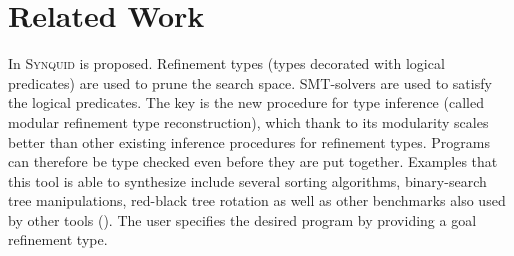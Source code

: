 \chapter{Related Work} \label{relatedwork}


In \cite{DBLP:journals/corr/PolikarpovaS15} \textsc{Synquid} is proposed.
Refinement types (types decorated with logical predicates) are used to prune the search space. SMT-solvers are used to satisfy the logical predicates. The key is the new procedure for type inference (called modular refinement type reconstruction), which thank to its modularity scales better than other existing inference procedures for refinement types. Programs can therefore be type checked even before they are put together.
Examples that this tool is able to synthesize include several sorting algorithms,
binary-search tree manipulations, red-black tree rotation as well as other benchmarks also used by other tools ().
The user specifies the desired program by providing a goal refinement type.

